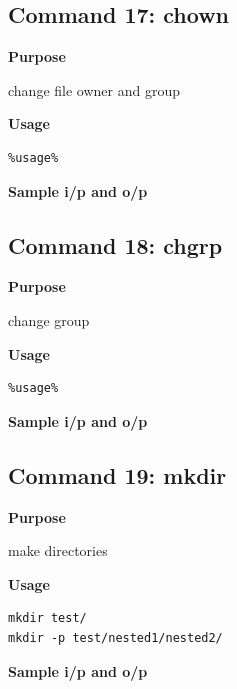 \documentclass{article}
\begin{document}
\subsection{Command 17: chown} 
\textbf{Purpose}
\begin{flushleft}
 change file owner and group
\end{flushleft}
\textbf{Usage}
\begin{verbatim}
%usage%
\end{verbatim}
\textbf{Sample i/p and o/p}
\begin{figure}[H] 
\end{figure}
\subsection{Command 18: chgrp} 
\textbf{Purpose}
\begin{flushleft}
 change group
\end{flushleft}
\textbf{Usage}
\begin{verbatim}
%usage%
\end{verbatim}
\textbf{Sample i/p and o/p}
\begin{figure}[H] 
\end{figure}
\subsection{Command 19: mkdir} 
\textbf{Purpose}
\begin{flushleft}
 make directories
\end{flushleft}
\textbf{Usage}
\begin{verbatim}
mkdir test/
mkdir -p test/nested1/nested2/
\end{verbatim}
\textbf{Sample i/p and o/p}
\begin{figure}[H] 
\end{figure}
\end{document}
